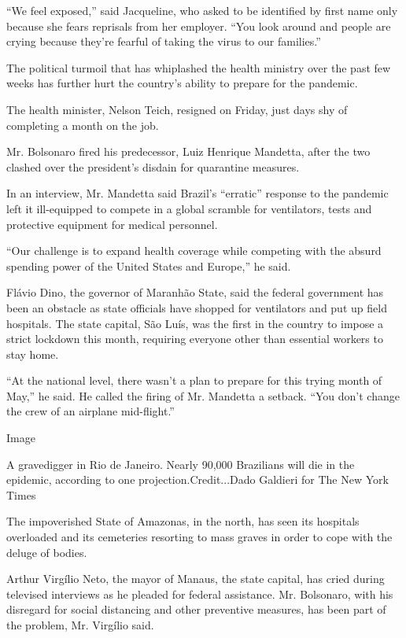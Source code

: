 ``We feel exposed,'' said Jacqueline, who asked to be identified by
first name only because she fears reprisals from her employer. ``You
look around and people are crying because they're fearful of taking the
virus to our families.''

The political turmoil that has whiplashed the health ministry over the
past few weeks has further hurt the country's ability to prepare for the
pandemic.

The health minister, Nelson Teich, resigned on Friday, just days shy of
completing a month on the job.

Mr. Bolsonaro fired his predecessor, Luiz Henrique Mandetta, after the
two clashed over the president's disdain for quarantine measures.

In an interview, Mr. Mandetta said Brazil's ``erratic'' response to the
pandemic left it ill-equipped to compete in a global scramble for
ventilators, tests and protective equipment for medical personnel.

``Our challenge is to expand health coverage while competing with the
absurd spending power of the United States and Europe,'' he said.

Flávio Dino, the governor of Maranhão State, said the federal government
has been an obstacle as state officials have shopped for ventilators and
put up field hospitals. The state capital, São Luís, was the first in
the country to impose a strict lockdown this month, requiring everyone
other than essential workers to stay home.

``At the national level, there wasn't a plan to prepare for this trying
month of May,'' he said. He called the firing of Mr. Mandetta a setback.
``You don't change the crew of an airplane mid-flight.''

Image

A gravedigger in Rio de Janeiro. Nearly 90,000 Brazilians will die in
the epidemic, according to one projection.Credit...Dado Galdieri for The
New York Times

The impoverished State of Amazonas, in the north, has seen its hospitals
overloaded and its cemeteries resorting to mass graves in order to cope
with the deluge of bodies.

Arthur Virgílio Neto, the mayor of Manaus, the state capital, has cried
during televised interviews as he pleaded for federal assistance. Mr.
Bolsonaro, with his disregard for social distancing and other preventive
measures, has been part of the problem, Mr. Virgílio said.

